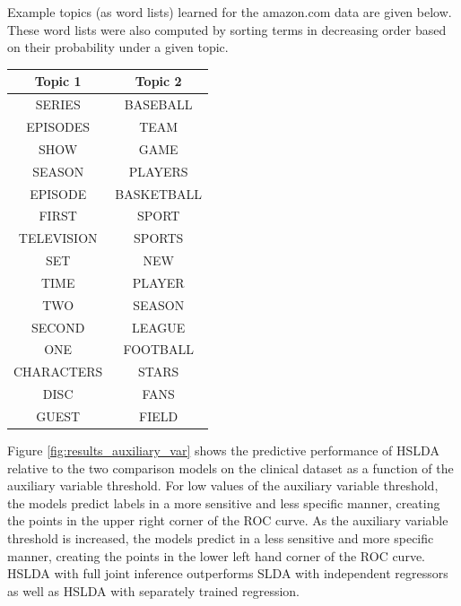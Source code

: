 Example topics (as word lists) learned for the amazon.com data are given below.  These word lists were also computed by sorting
terms in decreasing order based on their probability under a given topic.

\begin{extract}
\begin{tabular}{|c|c|}
\hline
\textbf{Topic 1} & \textbf{Topic 2} \\ \hline
SERIES & BASEBALL \\
\hline
EPISODES & TEAM \\
\hline
SHOW & GAME \\
\hline
SEASON & PLAYERS \\
\hline
EPISODE & BASKETBALL \\
\hline
FIRST & SPORT \\
\hline
TELEVISION & SPORTS \\
\hline
SET & NEW \\
\hline
TIME & PLAYER \\
\hline
TWO & SEASON \\
\hline
SECOND & LEAGUE \\
\hline
ONE & FOOTBALL \\
\hline
CHARACTERS & STARS \\
\hline
DISC & FANS \\
\hline
GUEST & FIELD \\
\hline
\end{tabular}
\end{extract}

Figure \ref{fig:results_auxiliary_var} shows the predictive performance of HSLDA 
relative to the two comparison models on the clinical dataset as a function of the auxiliary variable threshold. 
For low values of the auxiliary variable threshold, the models predict labels
in a more sensitive and less specific manner, creating the points in the upper
right corner of the ROC curve. As the auxiliary variable threshold is
increased, the models predict in a less sensitive and more specific manner,
creating the points in the lower left hand corner of the ROC curve. HSLDA with full joint inference outperforms SLDA with
independent regressors as well as HSLDA with separately trained
regression. 

